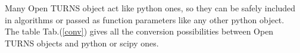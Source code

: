\renewcommand{\filename}{docUC_Intro_PythonStandards}
\renewcommand{\filetitle}{Link with other python standards}

\HeaderNNIILevel

Many Open TURNS object act like python ones, so they can be safely included in algorithms or passed as function parameters like any other python object.\\
The table Tab.(\ref{conv}) gives all the conversion possibilities between Open TURNS objects and python or scipy ones.

